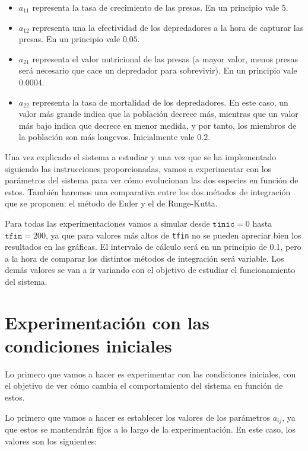 \documentclass[11pt,a4paper]{article}
\begin{document}
\begin{itemize}[label=\textbullet]
	\item $a_{11}$ representa la tasa de crecimiento de las presas. En un principio vale $5$.
	\item $a_{12}$ representa una la efectividad de los depredadores a la hora de
	capturar las presas. En un principio vale $0.05$.
	\item $a_{21}$ representa el valor nutricional de las presas (a mayor valor, menos
	presas será necesario que cace un depredador para sobrevivir). En un principio
	vale $0.0004$.
	\item $a_{22}$ representa la tasa de mortalidad de los depredadores. En este caso,
	un valor más grande indica que la población decrece más, mientras que un valor más
	bajo indica que decrece en menor medida, y por tanto, los miembros de la población
	son más longevos. Inicialmente vale $0.2$.
\end{itemize}

Una vez explicado el sistema a estudiar y una vez que se ha implementado siguiendo
las instrucciones proporcionadas, vamos a experimentar con los parámetros del sistema
para ver cómo evolucionan las dos especies en función de estos. También haremos
una comparativa entre los dos métodos de integración que se proponen: el método de Euler
y el de Runge-Kutta.

Para todas las experimentaciones vamos a simular desde $\texttt{tinic} = 0$ hasta $\texttt{tfin} = 200$,
ya que para valores más altos de \texttt{tfin} no se pueden apreciar bien
los resultados en las gráficas. El intervalo de cálculo será en un principio de 0.1, pero a la hora
de comparar los distintos métodos de integración será variable. Los demás valores se van
a ir variando con el objetivo de estudiar el funcionamiento del sistema.

\section{Experimentación con las condiciones iniciales}

Lo primero que vamos a hacer es experimentar con las condiciones iniciales, con el
objetivo de ver cómo cambia el comportamiento del sistema en función de estos.

Lo primero que vamos a hacer es establecer los valores de los parámetros $a_{ij}$,
ya que estos se mantendrán fijos a lo largo de la experimentación. En este caso,
los valores son los siguientes:
\end{document}
